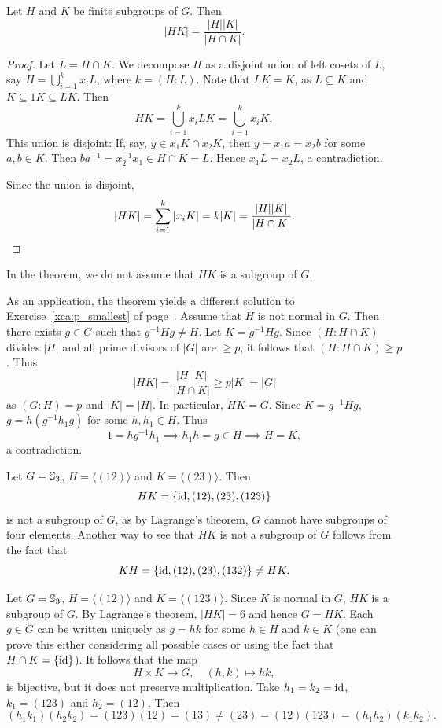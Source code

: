 \begin{theorem}
\label{thm:|HK|}
    Let $H$ and $K$ be finite subgroups of $G$. 
    Then 
    \[
        |HK|=\frac{|H||K|}{|H\cap K|}.
    \]
\end{theorem}

\begin{proof}
Let $L=H\cap K$.
We decompose $H$ as a disjoint union of left cosets of $L$, say 
$H=\bigcup_{i=1}^k x_iL$, where $k=(H:L)$. Note that $LK=K$, as $L\subseteq K$ and $K\subseteq 1K\subseteq LK$.
Then
\[
HK=\bigcup_{i=1}^k x_iLK=\bigcup_{i=1}^k x_iK,
\]
This union is disjoint: If, say, $y\in x_1K\cap x_2K$, then 
$y=x_1a=x_2b$ for some $a,b\in K$. Then $ba^{-1}=x_2^{-1}x_1\in H\cap K=L$. Hence
$x_1L=x_2L$, a contradiction. 

Since the union is disjoint, 
\[
|HK|=\sum_{i=1}^k |x_iK|=k|K|=\frac{|H||K|}{|H\cap K|}.\qedhere
\]
\end{proof}

In the theorem, we do not assume that $HK$ is a subgroup of $G$. 

\begin{optional}
As an application, the theorem yields a different solution to Exercise~\ref{xca:p_smallest} of page~\pageref{xca:p_smallest}. 
Assume that $H$ is not normal in $G$. Then 
there exists $g\in G$ such that 
$g^{-1}Hg\ne H$. Let $K=g^{-1}Hg$. Since $(H:H\cap K)$ divides $|H|$ 
and all prime divisors of $|G|$ 
are $\geq p$, it follows that $(H:H\cap K)\geq p$. Thus 
\[
|HK|=\frac{|H||K|}{|H\cap K|}\geq p|K|=|G|
\]
as $(G:H)=p$ and $|K|=|H|$. In particular, $HK=G$. Since $K=g^{-1}Hg$, 
$g=h(g^{-1}h_1g)$ for some $h,h_1\in H$. Thus 
\[
1=hg^{-1}h_1\implies h_1h=g\in H\implies H=K,
\]
a contradiction.
\end{optional}

\begin{example}
\label{exa:HKneKH}
Let $G=\mathbb{S}_3$, $H=\langle (12)\rangle$ and $K=\langle (23)\rangle$. Then 
\[
HK=\{\operatorname{id},(12),(23),(123)\}
\]
is not a subgroup of $G$, as by Lagrange's theorem, 
$G$ cannot have subgroups of four elements. Another way 
to see that $HK$ is not a subgroup of $G$ follows from 
the fact that 
\[
KH=\{\operatorname{id},(12),(23),(132)\}\ne HK.
\]
\end{example}

\begin{example}
\label{exa:anotherHK}
Let $G=\mathbb{S}_3$, $H=\langle (12)\rangle$ and $K=\langle (123)\rangle$.
Since $K$ is normal in $G$, $HK$ is a subgroup of $G$. By Lagrange's theorem, $|HK|=6$ and hence $G=HK$.
Each $g\in G$ can be written uniquely as $g=hk$ for some $h\in H$ and $k\in K$ (one can prove this either considering all possible cases or 
using the fact that $H\cap K=\{\operatorname{id}\}$). It follows that the map 
\[
H\times K\to G,\quad
(h,k)\mapsto hk,
\]
is bijective, but it does not preserve multiplication.
Take $h_1=k_2=\operatorname{id}$, $k_1=(123)$ and $h_2=(12)$. Then
\[
(h_1k_1)(h_2k_2)=(123)(12)=(13)
\ne(23)=(12)(123)=(h_1h_2)(k_1k_2).
\]
\end{example}

